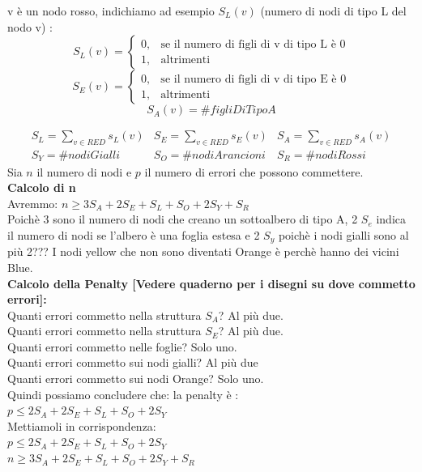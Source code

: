 v è un nodo rosso, indichiamo ad esempio $S_L(v)$ (numero di nodi di tipo L del nodo v) :
\begin{equation}\nonumber
S_L(v) = \begin{cases} 0, & \mbox{se il numero di figli di v di tipo L è 0}\\
1, & \mbox{altrimenti} \end{cases}
\end{equation}
\begin{equation}\nonumber
S_E(v) = \begin{cases} 0, & \mbox{se il numero di figli di v di tipo E è 0}\\
1, & \mbox{altrimenti} \end{cases}
\end{equation}
\begin{equation}\nonumber
S_A(v) = \#figliDiTipo A
\end{equation}

\begin{equation}
\begin{array}{ccc} 
S_L = \sum_{v \in RED} s_L(v) &
S_E = \sum_{v \in RED} s_E(v) &
S_A = \sum_{v \in RED} s_A(v) \\
S_Y = \#nodiGialli &
S_O = \#nodiArancioni &
S_R = \#nodiRossi
\end{array}
\end{equation}
Sia $n$ il numero di nodi e $p$ il numero di errori che possono commettere.\\
\textbf{Calcolo di n}\\
Avremmo:
$n \geq 3 S_A + 2 S_E + S_L + S_O + 2 S_Y + S_R$\\
Poichè 3 sono il numero di nodi che creano un sottoalbero di tipo A, 2 $S_e$ indica il numero di nodi se l'albero è una foglia estesa e 2 $S_y$ poichè i nodi gialli sono al più 2???
I nodi yellow che non sono diventati Orange è perchè hanno dei vicini Blue.\\
\textbf{Calcolo della Penalty [Vedere quaderno per i disegni su dove commetto errori]:} \\
Quanti errori commetto nella struttura $S_A$? Al più due.\\
Quanti errori commetto nella struttura $S_E$? Al più due.\\
Quanti errori commetto nelle foglie? Solo uno.\\
Quanti errori commetto sui nodi gialli? Al più due\\
Quanti errori commetto sui nodi Orange? Solo uno.\\
Quindi possiamo concludere che: la penalty è : \\
$p \leq 2 S_A + 2 S_E + S_L + S_O + 2 S_Y$\\
Mettiamoli in corrispondenza: \\
$p \leq 2 S_A + 2 S_E + S_L + S_O + 2 S_Y$\\
$n \geq 3 S_A + 2 S_E + S_L + S_O + 2 S_Y + S_R$\\

